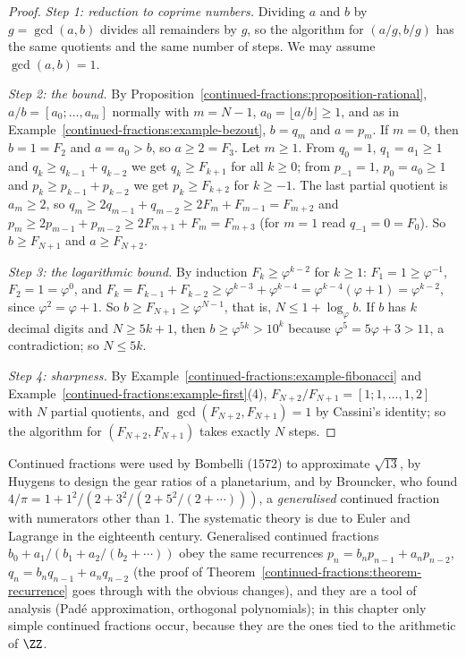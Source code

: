 \begin{proof}
\emph{Step 1: reduction to coprime numbers.} Dividing $a$ and $b$ by $g = \gcd(a, b)$ divides all remainders by $g$, so the algorithm for $(a/g, b/g)$ has the same quotients and the same number of
steps. We may assume $\gcd(a, b) = 1$.

\emph{Step 2: the bound.} By Proposition~\ref{continued-fractions:proposition-rational}, $a/b = [a_0; \ldots, a_m]$ normally with $m = N - 1$, $a_0 = \lfloor a/b \rfloor \geq 1$, and as in
Example~\ref{continued-fractions:example-bezout}, $b = q_m$ and $a = p_m$. If $m = 0$, then $b = 1 = F_2$ and $a = a_0 > b$, so $a \geq 2 = F_3$. Let $m \geq 1$. From $q_0 = 1$, $q_1 = a_1 \geq 1$
and $q_k \geq q_{k-1} + q_{k-2}$ we get $q_k \geq F_{k+1}$ for all $k \geq 0$; from $p_{-1} = 1$, $p_0 = a_0 \geq 1$ and $p_k \geq p_{k-1} + p_{k-2}$ we get $p_k \geq F_{k+2}$ for $k \geq -1$. The
last partial quotient is $a_m \geq 2$, so $q_m \geq 2q_{m-1} + q_{m-2} \geq 2F_m + F_{m-1} = F_{m+2}$ and $p_m \geq 2p_{m-1} + p_{m-2} \geq 2F_{m+1} + F_m = F_{m+3}$ (for $m = 1$ read
$q_{-1} = 0 = F_0$). So $b \geq F_{N+1}$ and $a \geq F_{N+2}$.

\emph{Step 3: the logarithmic bound.} By induction $F_k \geq \varphi^{k-2}$ for $k \geq 1$: $F_1 = 1 \geq \varphi^{-1}$, $F_2 = 1 = \varphi^0$, and
$F_k = F_{k-1} + F_{k-2} \geq \varphi^{k-3} + \varphi^{k-4} = \varphi^{k-4}(\varphi + 1) = \varphi^{k-2}$, since $\varphi^2 = \varphi + 1$. So $b \geq F_{N+1} \geq \varphi^{N-1}$, that is,
$N \leq 1 + \log_\varphi b$. If $b$ has $k$ decimal digits and $N \geq 5k + 1$, then $b \geq \varphi^{5k} > 10^k$ because $\varphi^5 = 5\varphi + 3 > 11$, a contradiction; so $N \leq 5k$.

\emph{Step 4: sharpness.} By Example~\ref{continued-fractions:example-fibonacci} and Example~\ref{continued-fractions:example-first}(4), $F_{N+2}/F_{N+1} = [1; 1, \ldots, 1, 2]$ with $N$
partial quotients, and $\gcd(F_{N+2}, F_{N+1}) = 1$ by Cassini's identity; so the algorithm for $(F_{N+2}, F_{N+1})$ takes exactly $N$ steps.
\end{proof}

\begin{remark}\label{continued-fractions:remark-history}
Continued fractions were used by Bombelli (1572) to approximate $\sqrt{13}$, by Huygens to design the gear ratios of a planetarium, and by Brouncker, who found
$4/\pi = 1 + 1^2/(2 + 3^2/(2 + 5^2/(2 + \cdots)))$, a \emph{generalised} continued fraction with numerators other than $1$. The systematic theory is due to Euler and Lagrange in the eighteenth century.
Generalised continued fractions $b_0 + a_1/(b_1 + a_2/(b_2 + \cdots))$ obey the same recurrences $p_n = b_np_{n-1} + a_np_{n-2}$, $q_n = b_nq_{n-1} + a_nq_{n-2}$ (the proof of
Theorem~\ref{continued-fractions:theorem-recurrence} goes through with the obvious changes), and they are a tool of analysis (Padé approximation, orthogonal polynomials); in this chapter only
simple continued fractions occur, because they are the ones tied to the arithmetic of $\ZZ$.
\end{remark}

